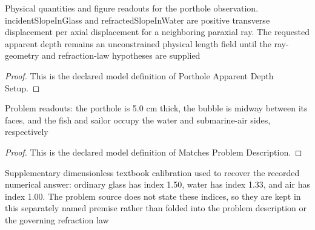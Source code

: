 \begin{definition}
  \label{def:physics:phyx-mini-0158:phyxminiproblems-problemphyxmini0158-portholeapparentdepthsetup}
  Physical quantities and figure readouts for the porthole observation. incidentSlopeInGlass and refractedSlopeInWater are positive transverse displacement per axial displacement for a neighboring paraxial ray. The requested apparent depth remains an unconstrained physical length field until the ray-geometry and refraction-law hypotheses are supplied
\end{definition}
\begin{proof}
  This is the declared model definition of Porthole Apparent Depth Setup.
\end{proof}
\begin{definition}
  \label{def:physics:phyx-mini-0158:phyxminiproblems-problemphyxmini0158-matchesproblemdescription}
  Problem readouts: the porthole is 5.0 cm thick, the bubble is midway between its faces, and the fish and sailor occupy the water and submarine-air sides, respectively
\end{definition}
\begin{proof}
  This is the declared model definition of Matches Problem Description.
\end{proof}
\begin{definition}
  \label{def:physics:phyx-mini-0158:phyxminiproblems-problemphyxmini0158-hasstandardmaterialreadouts}
  Supplementary dimensionless textbook calibration used to recover the recorded numerical answer: ordinary glass has index 1.50, water has index 1.33, and air has index 1.00. The problem source does not state these indices, so they are kept in this separately named premise rather than folded into the problem description or the governing refraction law
\end{definition}
